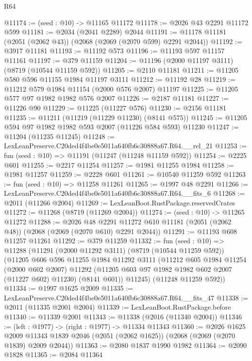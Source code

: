 \begin{lexlean}{R64}
\begin{coremodule}
@11174 := (seed : @10) -> @11165 @11172
@11178 := @2026 @43 @2291 @11172 @599
@11181 := @2034 (@2041 @2289) @2044
@11191 := @11178 @11181 (@2051 (@2062 @43)) (@2068 (@2069 (@2070 @599) @2291 @2044))
@11192 := @3917 @11181
@11193 := @11192 @573
@11196 := @11193 @597 @11157 @11161
@11197 := @379 @11159
@11204 := @11196 (@2000 @11197 @3111) (@8719 (@10544 @11159 @592))
@11205 := @2110 @11181
@11211 := @11205 @580 @596 @11155 @1984 @11197 @3111
@11212 := @11192 @28
@11219 := @11212 @579 @1984 @11154 (@2000 @576 @2007) @11197
@11225 := @11205 @577 @97 @1982 @1982 @576 @2007
@11226 := @2187 @11181
@11227 := @11226 @90
@11229 := @11225 (@11227 @576)
@11230 := @2156 @11181
@11235 := @11211 (@11219 (@11229 @11230) (@8141 @575))
@11245 := @11205 @594 @97 @1982 @1982 @593 @2007 (@11226 @584 @593) @11230
@11247 := @11204 (@11235 @11245)
@11248 := LexLeanPreserve.C20ded4f4be0e5011a640fb6c30888a67.R64.__rel_21
@11253 := fun (seed : @10) => @11191 (@11247 (@11248 @11159 @592))
@11254 := @2225 @601
@11255 := @2217 @11254
@11257 := @1981 @11255 @1984
@11258 := @1981 @11257
@11259 := @2228 @601
@11261 := @10540 @11259 @592
@11263 := fun (seed : @10) => @11258 @11261
@11265 := @1997 @48 @2291
@11266 := LexLeanPreserve.C20ded4f4be0e5011a640fb6c30888a67.R64.__fits_6
@11268 := @2011 (@11266 @2004)
@11269 := LexLeanBoot.RustPackage.reservedCrates
@11272 := @11268 (@8719 (@11269 @2004))
@11274 := (seed : @10) -> @11265 @11272
@11288 := @2026
    @48
    @2291
    @11272
    @610
    @11181
    (@2051 (@2062 @48))
    (@2068 (@2069 (@2070 @610) @2291 @2044))
@11291 := @11193 @608 @11257 @11261
@11292 := @379 @11259
@11332 := fun (seed : @10) =>
  @11288
    (@11291
      (@2000 @11292 @3111)
      (@8719 (@10544 @11259 @592))
      (@11205
        @606
        @596
        @11255
        @1984
        @11292
        @3111
        (@11212
          @605
          @1984
          @11254
          (@2000 @602 @2007)
          @11292
          (@11205 @603 @97 @1982 @1982 @602 @2007 (@11227 @602) @11230)
          (@8141 @601))
        @11245)
      (@11248 @11259 @592))
@11334 := @1997 @1625 @2009
@11335 := LexLeanPreserve.C20ded4f4be0e5011a640fb6c30888a67.R64.__fits_47
@11338 := @2011 (@11335 @2001 @2004)
@11339 := LexLeanBoot.RustPackage.before
@11340 := @11339 @2001
@11343 := @11338 (@2016 (@11340 @2004))
@11346 := (left : @1977) -> (right : @1977) -> @11334 @11343
@11360 := @2026
    @1625
    @2009
    @11343
    @1839
    @2046
    (@2051 (@2062 @1625))
    (@2068 (@2069 (@2070 @1839) @2009 @2044))
@11363 := @2080 @1837 @1990 @1982
@11364 := @2090 @1828
@11365 := @2084 @11364

\end{coremodule}
\end{lexlean}
